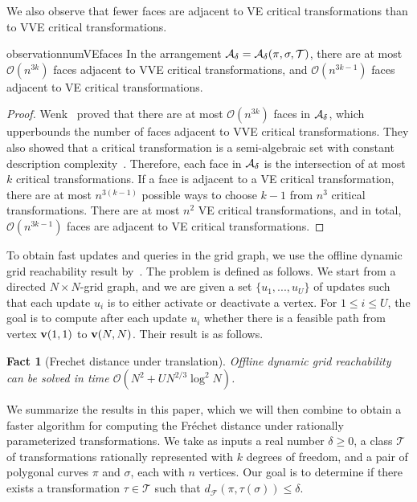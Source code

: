 \documentclass[thm-restate]{lipics-v2021}
\newtheorem{fact}[theorem]{Fact}
\theoremstyle{remark}
\newcommand{\Oh}{\mathcal{O}}
\newcommand{\df}[1]{d_{\mathcal{F}}(#1)}
\newcommand{\vertex}[1]{\normalfont \textbf{v}(#1)}
\newcommand{\trans}[0]{\mathcal{T}}
\begin{document}
We also observe that fewer faces are adjacent to VE critical transformations than to VVE critical transformations. 
\begin{restatable}{observation}{numVEfaces} \label{obs:number-vve-ve-faces}
    In the arrangement $\arrangement = \arrangement(\pi, \sigma, \trans)$, there are at most $\Oh(n^{3k})$ faces adjacent to VVE critical transformations, and $\Oh(n^{3k - 1})$ faces adjacent to VE critical transformations. 
\end{restatable}
\begin{proof}
    Wenk~\cite{wenkShapeMatchingHigher2003} proved that there are at most $\Oh(n^{3k})$ faces in $\mathcal{A_\delta}$, which upperbounds the number of faces adjacent to VVE critical transformations. They also showed that a critical transformation is a semi-algebraic set with constant description complexity~\cite[Lemma 24]{wenkShapeMatchingHigher2003}. Therefore, each face in $\mathcal{A_\delta}$ is the intersection of at most $k$ critical transformations. If a face is adjacent to a VE critical transformation, there are at most $n^{3(k - 1)}$ possible ways to choose $k - 1$ from $n^3$ critical transformations. There are at most $n^2$ VE critical transformations, and in total, $\Oh(n^{3k - 1})$ faces are adjacent to VE critical transformations. 
\end{proof}

To obtain fast updates and queries in the grid graph, we use the offline dynamic grid reachability result by~\cite{bringmannFrechetDistanceTranslation2021}. The problem is defined as follows. We start from a directed $N \times N$-grid graph, and we are given a set $\{u_1, ..., u_U\}$ of updates such that each update $u_i$ is to either activate or deactivate a vertex. For $1 \leq i \leq U$, the goal is to compute after each update $u_i$ whether there is a feasible path from vertex $\vertex{1, 1}$ to $\vertex{N, N}$. Their result is as follows. 
\begin{fact}[Frechet distance under translation{\cite[Theorem~3.4]{bringmannFrechetDistanceTranslation2021}}] \label{fac:bkn-ggraph-theorem}
    Offline dynamic grid reachability can be solved in time $\Oh(N^2 + U N^{2/3} \log^2 N)$. 
\end{fact}

We summarize the results in this paper, which we will then combine to obtain a faster algorithm for computing the Fr\'echet distance under rationally parameterized transformations. We take as inputs a real number $\delta \geq 0$, a class $\trans$ of transformations rationally represented with $k$ degrees of freedom, and a pair of polygonal curves $\pi$ and $\sigma$, each with $n$ vertices. Our goal is to determine if there exists a transformation $\tau \in \trans$ such that $\df{\pi, \tau(\sigma)} \leq \delta$. 
\end{document}
